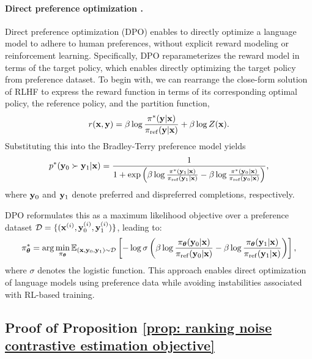 \paragraph{Direct preference optimization \citep{rafailov2024direct}.}
Direct preference optimization (DPO) enables to directly optimize a language model to adhere to human preferences,
without explicit reward modeling or reinforcement learning.
Specifically,
DPO reparameterizes the reward model in terms of the target policy,
which enables directly optimizing the target policy from preference dataset.
To begin with,
we can rearrange the close-form solution of RLHF to express the reward function in terms of its corresponding optimal policy, the reference policy,
and the partition function,
\begin{equation*}
r(\mathbf{x}, \mathbf{y})
=
\beta 
\log
\frac{\pi^{\ast}(\mathbf{y} | \mathbf{x})}
{\pi_{\rm ref}(\mathbf{y} | \mathbf{x})}
+
\beta
\log Z(\mathbf{x}).
\end{equation*}
Substituting this into the Bradley-Terry preference model \citep{bradley1952rank} yields
\begin{equation*}
    p^{*}(\mathbf{y}_0 \succ \mathbf{y}_1 | \mathbf{x})
    = \frac{1}{1 + \exp\left( 
        \beta \log \frac{\pi^{*}(\mathbf{y}_1 | \mathbf{x})}{\pi_{\rm ref}(\mathbf{y}_1 | \mathbf{x})}
        - \beta \log \frac{\pi^{*}(\mathbf{y}_0 | \mathbf{x})}{\pi_{\rm ref}(\mathbf{y}_0 | \mathbf{x})}
    \right)},
\end{equation*}
where $\mathbf{y}_0$ and $\mathbf{y}_1$ denote preferred and dispreferred completions, respectively.


DPO reformulates this as a maximum likelihood objective over a preference dataset $\mathcal{D} = \{(\mathbf{x}^{(i)}, \mathbf{y}_0^{(i)}, \mathbf{y}_1^{(i)})\}$, leading to:
\begin{equation*}
    \pi_{\boldsymbol{\theta}}^{*}
    = \arg\min_{\pi_{\boldsymbol{\theta}}} 
    \mathbb{E}_{(\mathbf{x},\mathbf{y}_0,\mathbf{y}_1) \sim \mathcal{D}}
    \left[ 
        -\log \sigma\left( 
            \beta \log \frac{\pi_{\boldsymbol{\theta}}(\mathbf{y}_0 | \mathbf{x})}{\pi_{\rm ref}(\mathbf{y}_0 | \mathbf{x})} 
            - \beta \log \frac{\pi_{\boldsymbol{\theta}}(\mathbf{y}_1 | \mathbf{x})}{\pi_{\rm ref}(\mathbf{y}_1 | \mathbf{x})}
        \right)
    \right],
\end{equation*}
where $\sigma$ denotes the logistic function. 
This approach enables direct optimization of language models using preference data while avoiding instabilities associated with RL-based training.


\subsection{Proof of Proposition \ref{prop: ranking noise contrastive estimation objective}}
\label{sec: RNCE objective function derivation}
\rnce*

